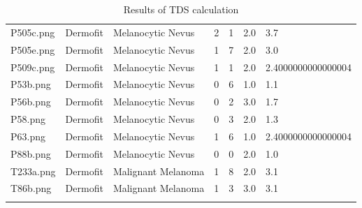 \begin{longtable}{ | l | l | l | l | l | l | l |}
P505c.png & Dermofit & Melanocytic Nevus & 2 & 1 & 2.0 & 3.7 \\
P505e.png & Dermofit & Melanocytic Nevus & 1 & 7 & 2.0 & 3.0 \\
P509c.png & Dermofit & Melanocytic Nevus & 1 & 1 & 2.0 & 2.4000000000000004 \\
P53b.png & Dermofit & Melanocytic Nevus & 0 & 6 & 1.0 & 1.1 \\
P56b.png & Dermofit & Melanocytic Nevus & 0 & 2 & 3.0 & 1.7 \\
P58.png & Dermofit & Melanocytic Nevus & 0 & 3 & 2.0 & 1.3 \\
P63.png & Dermofit & Melanocytic Nevus & 1 & 6 & 1.0 & 2.4000000000000004 \\
P88b.png & Dermofit & Melanocytic Nevus & 0 & 0 & 2.0 & 1.0 \\
T233a.png & Dermofit & Malignant Melanoma & 1 & 8 & 2.0 & 3.1 \\
T86b.png & Dermofit & Malignant Melanoma & 1 & 3 & 3.0 & 3.1 \\
\caption{Results of TDS calculation}
\label{fig:tds_results}
\end{longtable}
